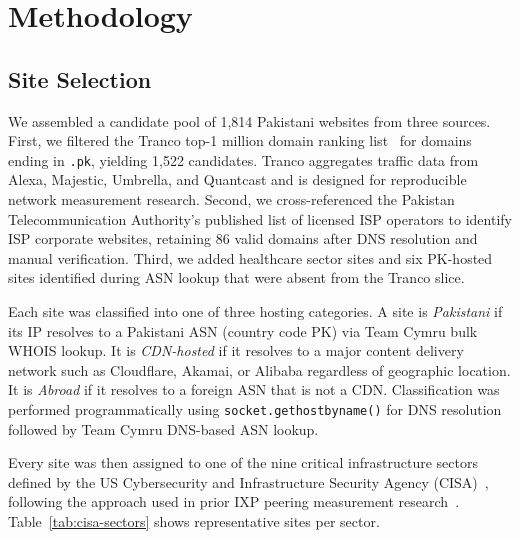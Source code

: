 \documentclass[sigconf,anonymous,10pt]{acmart}
\begin{document}
\section{Methodology}
\subsection{Site Selection}
\label{sec:sites}

We assembled a candidate pool of 1,814 Pakistani websites from three sources. First, we filtered the Tranco top-1 million domain ranking list~\cite{tranco} for domains ending in \texttt{.pk}, yielding 1,522 candidates. Tranco aggregates traffic data from Alexa, Majestic, Umbrella, and Quantcast and is designed for reproducible network measurement research. Second, we cross-referenced the Pakistan Telecommunication Authority's published list of licensed ISP operators to identify ISP corporate websites, retaining 86 valid domains after DNS resolution and manual verification. Third, we added healthcare sector sites and six PK-hosted sites identified during ASN lookup that were absent from the Tranco slice.

Each site was classified into one of three hosting categories. A site is \textit{Pakistani} if its IP resolves to a Pakistani ASN (country code PK) via Team Cymru bulk WHOIS lookup. It is \textit{CDN-hosted} if it resolves to a major content delivery network such as Cloudflare, Akamai, or Alibaba regardless of geographic location. It is \textit{Abroad} if it resolves to a foreign ASN that is not a CDN. Classification was performed programmatically using \texttt{socket.gethostbyname()} for DNS resolution followed by Team Cymru DNS-based ASN lookup.

Every site was then assigned to one of the nine critical infrastructure sectors defined by the US Cybersecurity and Infrastructure Security Agency (CISA)~\cite{cisa}, following the approach used in prior IXP peering measurement research~\cite{dibartolomeo2015}. Table~\ref{tab:cisa-sectors} shows representative sites per sector.
\end{document}
